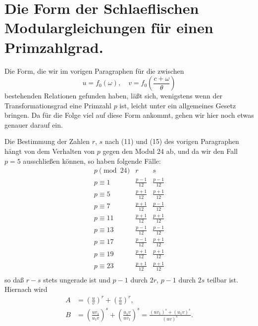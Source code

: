\documentclass[12pt,a4paper]{article}
\theoremstyle{definition}
\begin{document}
\section{Die Form der Schlaeflischen Modulargleichungen für einen Primzahlgrad.}\label{sec:74}

Die Form, die wir im vorigen Paragraphen für die zwischen
\begin{equation}\label{eq:74-1}
u = f_0(\omega), \quad v = f_0\left(\frac{c + \omega}{\theta}\right)
\end{equation}
bestehenden Relationen gefunden haben, läßt sich, wenigstens wenn der Transformationsgrad eine Primzahl $p$ ist, leicht unter ein allgemeines Gesetz bringen. Da für die Folge viel auf diese Form ankommt, gehen wir hier noch etwas genauer darauf ein.

Die Bestimmung der Zahlen $r$, $s$ nach (11) und (15) des vorigen Paragraphen hängt von dem Verhalten von $p$ gegen den Modul 24 ab, und da wir den Fall $p = 5$ ausschließen können, so haben folgende Fälle:
\begin{equation}\label{eq:74-2}
\begin{array}{c|c|c}
p \pmod{24} & r & s \\
\hline
p \equiv 1 & \frac{p-1}{12} & \frac{p-1}{12} \\
p \equiv 5 & \frac{p+1}{12} & \frac{p+1}{12} \\
p \equiv 7 & \frac{p+1}{12} & \frac{p-1}{12} \\
p \equiv 11 & \frac{p+1}{12} & \frac{p+1}{12} \\
p \equiv 13 & \frac{p-1}{12} & \frac{p-1}{12} \\
p \equiv 17 & \frac{p-1}{12} & \frac{p+1}{12} \\
p \equiv 19 & \frac{p+1}{12} & \frac{p+1}{12} \\
p \equiv 23 & \frac{p+1}{12} & \frac{p+1}{12} \\
\end{array}
\end{equation}
so daß $r - s$ stets ungerade ist und $p-1$ durch $2r$, $p-1$ durch $2s$ teilbar ist. Hiernach wird
\begin{equation}\label{eq:74-3}
\begin{aligned}
A &= \left(\frac{u}{v}\right)^r + \left(\frac{v}{u}\right)^r, \\
B &= \left(\frac{uv_1}{u_1v}\right)^s + \left(\frac{u_1v}{uv_1}\right)^s = \frac{(uv_1)^s + (u_1v)^s}{(uv)^s}.
\end{aligned}
\end{equation}
\end{document}
